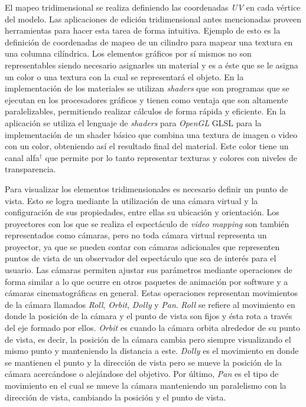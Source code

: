 El mapeo tridimensional se realiza definiendo las coordenadas \emph{UV} en cada vértice del modelo. Las aplicaciones de edición tridimensional antes mencionadas proveen herramientas para hacer esta tarea de forma intuitiva. Ejemplo de esto es la definición de coordenadas de mapeo de un cilindro para mapear una textura en una columna cilíndrica.
Los elementos gráficos por sí mismos no son representables siendo necesario asignarles un material y es a éste que se le asigna un color o una textura con la cual se representará el objeto.
En la implementación de los materiales se utilizan \emph{shaders} que son programas que se ejecutan en los procesadores gráficos y tienen como ventaja que son altamente paralelizables, permitiendo realizar cálculos de forma rápida y eficiente. En la aplicación se utiliza el lenguaje de \emph{shaders} para \emph{OpenGL} GLSL\cite{GLSL} para la implementación de un shader básico que combina una textura de imagen o video con un color, obteniendo así el resultado final del material. Este color tiene un canal alfa$^\dagger$ que permite por lo tanto representar texturas y colores con niveles de transparencia.

Para visualizar los elementos tridimensionales es necesario definir un punto de vista. Esto se logra mediante la utilización de una cámara virtual y la configuración de sus propiedades, entre ellas su ubicación y orientación. Los proyectores con los que se realiza el espectáculo de \emph{video mapping} son también representados como cámaras, pero no toda cámara virtual representa un proyector, ya que se pueden contar con cámaras adicionales que representen puntos de vista de un observador del espectáculo que sea de interés para el usuario.
Las cámaras permiten ajustar sus parámetros mediante operaciones de forma similar a lo que ocurre en otros paquetes de animación por software y a cámaras cinematográficas en general. Estas operaciones representan movimientos de la cámara llamados \emph{Roll}, \emph{Orbit}, \emph{Dolly} y \emph{Pan}. \emph{Roll} se refiere al movimiento en donde la posición de la cámara y el punto de vista son fijos y ésta rota a través del eje formado por ellos. \emph{Orbit} es cuando la cámara orbita alrededor de su punto de vista, es decir, la posición de la cámara cambia pero siempre visualizando el mismo punto y manteniendo la distancia a este. \emph{Dolly} es el movimiento en donde se mantienen el punto y la dirección de vista pero se mueve la posición de la cámara acercándose o alejándose del objetivo. Por último, \emph{Pan} es el tipo de movimiento en el cual se mueve la cámara manteniendo un paralelismo con la dirección de vista, cambiando la posición y el punto de vista.

